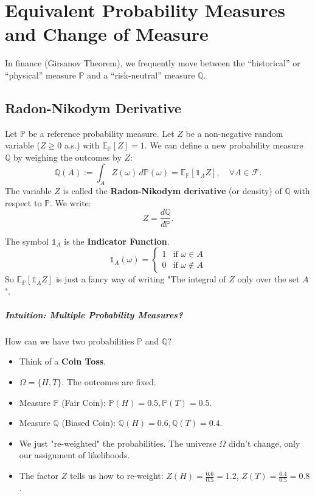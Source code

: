 \chapter{Equivalent Probability Measures and Change of Measure}

In finance (Girsanov Theorem), we frequently move between the ``historical'' or ``physical'' measure $\mathbb{P}$ and a ``risk-neutral'' measure $\mathbb{Q}$.

\section{Radon-Nikodym Derivative}

\begin{definition}
Let $\mathbb{P}$ be a reference probability measure. Let $Z$ be a non-negative random variable ($Z \geq 0$ a.s.) with $\mathbb{E}_{\mathbb{P}}[Z] = 1$.
We can define a new probability measure $\mathbb{Q}$ by weighing the outcomes by $Z$:
\[
\mathbb{Q}(A) := \int_A Z(\omega) \, d\mathbb{P}(\omega) = \mathbb{E}_{\mathbb{P}}[ \mathbb{1}_A Z ], \quad \forall A \in \mathcal{F}.
\]
The variable $Z$ is called the \textbf{Radon-Nikodym derivative} (or density) of $\mathbb{Q}$ with respect to $\mathbb{P}$. We write:
\[
Z = \frac{d\mathbb{Q}}{d\mathbb{P}}.
\]
\end{definition}

\begin{remark}
The symbol $\mathbb{1}_A$ is the \textbf{Indicator Function}.
\[
\mathbb{1}_A(\omega) = \begin{cases} 
1 & \text{if } \omega \in A \\
0 & \text{if } \omega \notin A 
\end{cases}
\]
So $\mathbb{E}_{\mathbb{P}}[\mathbb{1}_A Z]$ is just a fancy way of writing "The integral of $Z$ only over the set $A$".
\end{remark}

\paragraph{Intuition: Multiple Probability Measures?}
How can we have two probabilities $\mathbb{P}$ and $\mathbb{Q}$?
\begin{itemize}
    \item Think of a \textbf{Coin Toss}.
    \item $\Omega = \{H, T\}$. The outcomes are fixed.
    \item Measure $\mathbb{P}$ (Fair Coin): $\mathbb{P}(H) = 0.5, \mathbb{P}(T) = 0.5$.
    \item Measure $\mathbb{Q}$ (Biased Coin): $\mathbb{Q}(H) = 0.6, \mathbb{Q}(T) = 0.4$.
    \item We just "re-weighted" the probabilities. The universe $\Omega$ didn't change, only our assignment of likelihoods.
    \item The factor $Z$ tells us how to re-weight: $Z(H) = \frac{0.6}{0.5} = 1.2$, $Z(T) = \frac{0.4}{0.5} = 0.8$.
\end{itemize}

